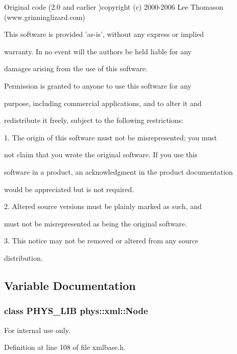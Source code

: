  Original code (2.0 and earlier )copyright (c) 2000-\/2006 Lee Thomason (www.grinninglizard.com) \par
 This software is provided 'as-\/is', without any express or implied \par
 warranty. In no event will the authors be held liable for any \par
 damages arising from the use of this software. \par
 \par
 Permission is granted to anyone to use this software for any \par
 purpose, including commercial applications, and to alter it and \par
 redistribute it freely, subject to the following restrictions: \par
 \par
 1. The origin of this software must not be misrepresented; you must \par
 not claim that you wrote the original software. If you use this \par
 software in a product, an acknowledgment in the product documentation \par
 would be appreciated but is not required. \par
 \par
 2. Altered source versions must be plainly marked as such, and \par
 must not be misrepresented as being the original software. \par
 \par
 3. This notice may not be removed or altered from any source \par
 distribution. \par
 \par
 

\subsection{Variable Documentation}
\hypertarget{namespacephys_1_1xml_ab52f16bbf03980beb1c58fa15423a681}{
\subsubsection[{Node}]{\setlength{\rightskip}{0pt plus 5cm}class PHYS\_\-LIB {\bf phys::xml::Node}}}
\label{d9/d27/namespacephys_1_1xml_ab52f16bbf03980beb1c58fa15423a681}
\begin{DoxyInternal}{For internal use only.}
\end{DoxyInternal}


Definition at line 108 of file xmlbase.h.

